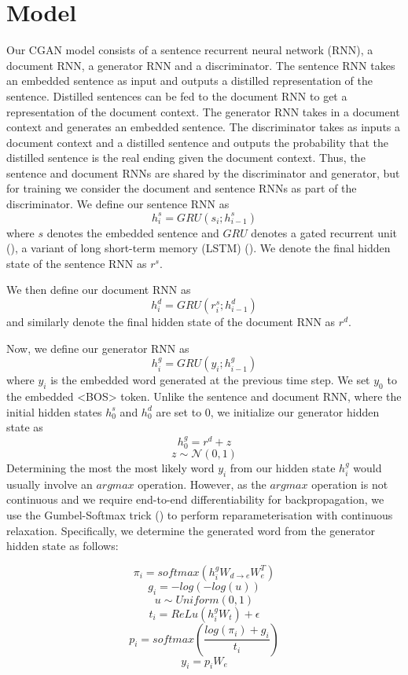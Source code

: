 \documentclass{article}
\begin{document}
\section{Model}
Our CGAN model consists of a sentence recurrent neural network (RNN), a document RNN, a generator RNN and a discriminator. The sentence RNN takes an embedded sentence as input and outputs a distilled representation of the sentence. Distilled sentences can be fed to the document RNN to get a representation of the document context. The generator RNN takes in a document context and generates an embedded sentence. The discriminator takes as inputs a document context and a distilled sentence and outputs the probability that the distilled sentence is the real ending given the document context. Thus, the sentence and document RNNs are shared by the discriminator and generator, but for training we consider the document and sentence RNNs as part of the discriminator.
We define our sentence RNN as
$$ h^{s}_{i} = GRU(s_{i}; h^{s}_{i-1})$$
where $s$ denotes the embedded sentence and $GRU$ denotes a gated recurrent unit (\cite{DBLP:journals/corr/ChoMGBSB14}), a variant of long short-term memory (LSTM) (\cite{articffle}). We denote the final hidden state of the sentence RNN as $r^{s}$.

We then define our document RNN as
$$ h^{d}_{i} = GRU(r^{s}_{i}; h^{d}_{i-1}) $$
and similarly denote the final hidden state of the document RNN as $r^{d}$.

Now, we define our generator RNN as
$$ h^{g}_{i} = GRU(y_{i}; h^{g}_{i-1}) $$
where $y_{i}$ is the embedded word generated at the previous time step. We set $y_{0}$ to the embedded <BOS> token. Unlike the sentence and document RNN, where the initial hidden states $h^{s}_{0}$ and $h^{d}_{0}$ are set to 0, we initialize our generator hidden state as
$$ h^{g}_{0} = r^{d} + z $$
$$ z \sim \mathcal{N}(0,1) $$
Determining the most the most likely word $y_{i}$ from our hidden state $h^{g}_{i}$ would usually involve an $argmax$ operation. However, as the $argmax$ operation is not continuous and we require end-to-end differentiability for backpropagation, we use the Gumbel-Softmax trick (\cite{2016arXiv161101144J}) to perform reparameterisation with continuous relaxation. Specifically, we determine the generated word from the generator hidden state as follows:

$$ \pi_{i} = softmax(h^{g}_{i}W_{d \rightarrow e}W_{e}^{T})$$
$$ g_{i} = -log(-log(u)) $$
$$ u \sim Uniform(0,1) $$
$$ t_{i} = ReLu(h^{g}_{i}W_{t}) + \epsilon $$
$$ p_{i} = softmax(\frac{log(\pi_{i}) + g_{i}}{t_{i}}) $$
$$ y_{i} = p_{i}W_{e}$$
\end{document}
